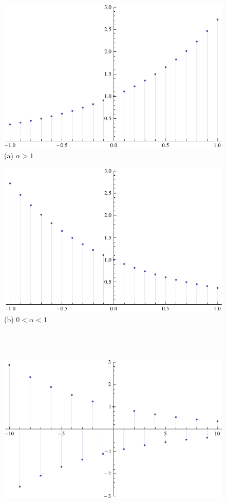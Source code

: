             \begin{figure}[h]\centering
                \begin{minipage}{0.4\linewidth}\centering
                    \includegraphics[width=0.8\linewidth]{signals_chaps/lect2_inc/dt-sample-a.pdf}\\
                    (a) $\alpha>1$
                \end{minipage}
                \begin{minipage}{0.4\linewidth}\centering
                    \includegraphics[width=0.8\linewidth]{signals_chaps/lect2_inc/dt-sample-b.pdf}\\
                    (b) $0<\alpha<1$
                \end{minipage}\\\
                \begin{minipage}{0.4\linewidth}\centering
                    \includegraphics[width=0.8\linewidth]{signals_chaps/lect2_inc/dt-sample-c.pdf}\\

\end{minipage}
\end{figure}
